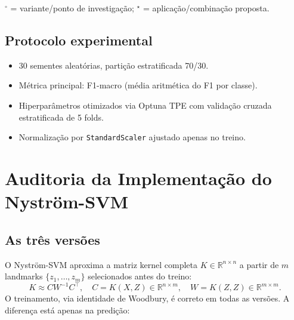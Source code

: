 \documentclass[12pt,a4paper]{article}
\begin{document}
\noindent$^\circ$ = variante/ponto de investigação;
$^\star$ = aplicação/combinação proposta.

\subsection*{Protocolo experimental}

\begin{itemize}
  \item 30 sementes aleatórias, partição estratificada 70/30.
  \item Métrica principal: F1-macro (média aritmética do F1 por classe).
  \item Hiperparâmetros otimizados via Optuna TPE com validação cruzada
        estratificada de 5 folds.
  \item Normalização por \texttt{StandardScaler} ajustado apenas no treino.
\end{itemize}

\section{Auditoria da Implementação do Nyström-SVM}
\label{sec:nystrom_fix}

\subsection{As três versões}

O Nyström-SVM aproxima a matriz kernel completa $K \in \mathbb{R}^{n \times n}$
a partir de $m$ landmarks $\{z_1, \ldots, z_m\}$ selecionados antes do treino:
\[
  K \approx C W^{-1} C^\top, \quad C = K(X, Z) \in \mathbb{R}^{n \times m},
  \quad W = K(Z, Z) \in \mathbb{R}^{m \times m}.
\]
O treinamento, via identidade de Woodbury, é correto em todas as versões.
A diferença está apenas na predição:
\end{document}

